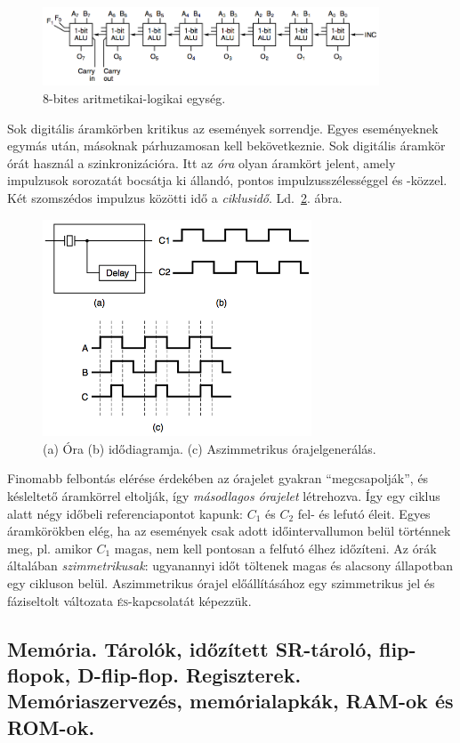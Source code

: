 \documentclass[10pt]{article}
\begin{document}
\begin{figure}[htbp]
	\centering
		\includegraphics[width=10cm]{img/8bitalu}
	\caption{8-bites aritmetikai-logikai egység.\label{fig:8bitalu}}
\end{figure}

Sok digitális áramkörben kritikus az események sorrendje. Egyes eseményeknek egymás után, másoknak párhuzamosan kell bekövetkeznie. Sok digitális áramkör órát használ a szinkronizációra. Itt az \emph{óra} olyan áramkört jelent, amely impulzusok sorozatát bocsátja ki állandó, pontos impulzusszélességgel és -közzel. Két szomszédos impulzus közötti idő a \emph{ciklusidő}. Ld.~\ref{fig:ora}. ábra.

\begin{figure}[htbp]
	\centering
		\includegraphics[width=8cm]{img/ora}
	\caption{(a) Óra (b) idődiagramja. (c) Aszimmetrikus órajelgenerálás.\label{fig:ora}}
\end{figure}

Finomabb felbontás elérése érdekében az órajelet gyakran ``megcsapolják'', és késleltető áramkörrel eltolják, így \emph{másodlagos órajelet} létrehozva. Így egy ciklus alatt négy időbeli referenciapontot kapunk: $C_1$ és $C_2$ fel- és lefutó éleit. Egyes áramkörökben elég, ha az események csak adott időintervallumon belül történnek meg, pl. amikor $C_1$ magas, nem kell pontosan a felfutó élhez időzíteni. Az órák általában \emph{szimmetrikusak}: ugyanannyi időt töltenek magas és alacsony állapotban egy cikluson belül. Aszimmetrikus órajel előállításához egy szimmetrikus jel és fáziseltolt változata \textsc{és}-kapcsolatát képezzük.

\subsection{Memória. Tárolók, időzített SR-tároló, flip-flopok, D-flip-flop. Regiszterek. Memóriaszervezés, memórialapkák, RAM-ok és ROM-ok.}
\end{document}
